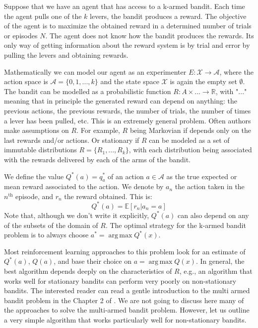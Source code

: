 \documentclass[11pt,a4paper,twoside]{report}
\DeclareMathOperator*{\argmax}{arg\,max}
\newcommand{\+}{\textnormal{+} }
\theoremstyle{definition}
\numberwithin{equation}{chapter}
\begin{document}
Suppose that we have an agent that has access to a k-armed bandit. Each time the
agent pulls one of the $k$ levers, the bandit produces a reward. The objective
of the agent is to maximize the obtained reward in a determined number of trials
or episodes $N$. The agent does not know how the bandit produces the rewards. Its
only way of getting information about the reward system is by trial and error by
pulling the levers and obtaining rewards.

Mathematically we can model our agent as an experimenter
$E:\mathcal{X}\rightarrow\mathcal{A}$, where the action space is
$\mathcal{A}=\{0,1,...,k\}$ and the state space $\mathcal{X}$ is again the empty
set $\emptyset$. The bandit can be modelled as a probabilistic function
$R:A\times ... \rightarrow \mathbb{R}$, with "$...$" meaning that in principle
the generated reward can depend on anything: the previous actions, the previous
rewards, the number of trials, the number of times a lever has been pulled, etc.
This is an extremely general problem. Often authors make assumptions on $R$. For
example, $R$ being Markovian if depends only on the last rewards and/or actions.
Or stationary if $R$ can be modeled as a set of immutable distributions
$R=\{R_1,... , R_k\}$, with each distribution being associated with the rewards
delivered by each of the arms of the bandit.

We define the value $Q^*(a)=q^*_a$ of an action $a \in \mathcal{A}$ as the true
expected or mean reward associated to the action. We denote by $a_n$ the action
taken in the $n^\text{th}$ episode, and $r_n$ the reward obtained. This is:
\begin{equation}
  Q^*(a) = \mathbb{E}[r_n|a_n = a]
\end{equation}
Note that, although we don't write it explicitly, $Q^*(a)$ can also depend on 
any of the subsets of the domain of $R$.
The optimal strategy for the k-armed bandit problem is to always choose 
$a^*=\argmax Q^*(x)$.

Most reinforcement learning approaches to this problem look for an estimate of
$Q^*(a)$, $Q(a)$, and base their choice on $a=\argmax Q(x)$. In general, the
best algorithm depends deeply on the characteristics of $R$, e.g., an algorithm
that works well for stationary bandits can perform very poorly on non-stationary
bandits. The interested reader can read a gentle introduction to the multi armed
bandit problem in the Chapter 2 of \cite{sutton2018reinforcement}. We are not
going to discuss here many of the approaches to solve the multi-armed bandit
problem. However, let us outline a very simple algorithm that works particularly
well for non-stationary bandits. 
\end{document}
